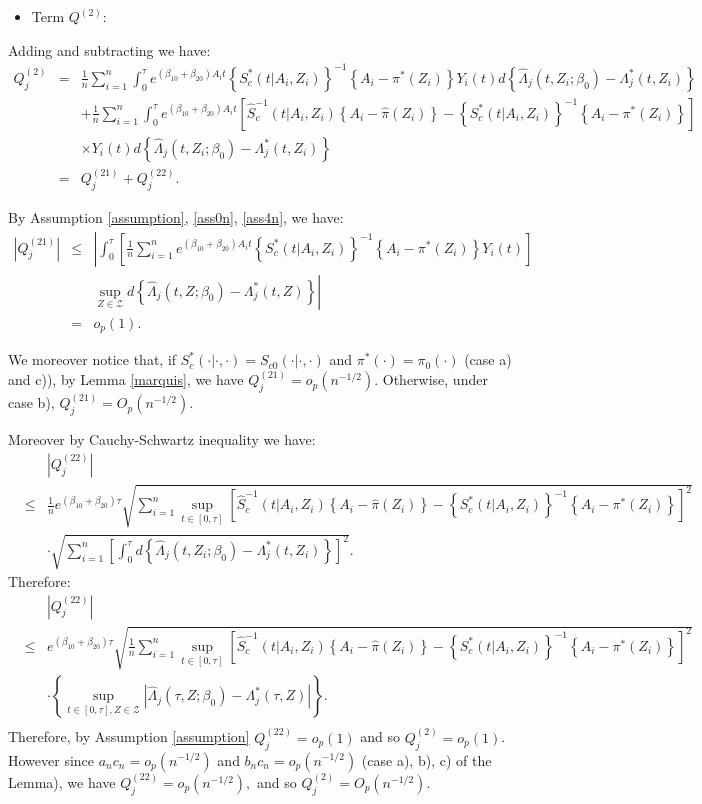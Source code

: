 \documentclass[11pt]{article}
\newcommand{\eqnn}{\begin{eqnarray*}}
\newcommand{\een}{\end{eqnarray*}}
\begin{document}
\begin{newproof7}
\begin{itemize}
\item{Term $Q^{(2)}$:}
\end{itemize}
Adding and subtracting we have:
\eqnn
Q^{(2)}_j&=&\frac{1}{n}\sum_{i=1}^n\int_0^\tau e^{ (\beta_{10}  + \beta_{20}) A_i t}\left\{S^{*}_c(t | A_i,Z_i)\right\}^{-1}\left\{A_i -\pi^{*}( Z_i)\right\}Y_i(t)d\left\{\hat \Lambda_{j}(t, Z_i ; \beta_0)-\Lambda^{*}_{j}(t, Z_i)\right\}\\
&&+\frac{1}{n}\sum_{i=1}^n\int_0^\tau e^{ (\beta_{10}  + \beta_{20}) A_i t}\left[\hat S^{-1}_c(t | A_i,Z_i)\left\{A_i -\hat \pi( Z_i)\right\}-\left\{S^{*}_c(t | A_i,Z_i)\right\}^{-1}\left\{A_i -\pi^{*}( Z_i)\right\}\right]\nonumber\\&&\times Y_i(t)d\left\{\hat \Lambda_{j}(t, Z_i ; \beta_0)-\Lambda^{*}_{j}(t, Z_i)\right\}\\
&=&Q^{(21)}_j+Q^{(22)}_j.
\een

By Assumption \ref{assumption}, \ref{ass0n}, \ref{ass4n}, we have:
\eqnn
\left|Q^{(21)}_j\right|&\leq&  \left|\int_0^\tau 
\left[ \frac{1}{n} \sum_{i=1}^ne^{(\beta_{10}+\beta_{20})A_it}\left\{S^{*}_c(t | A_i,Z_i)\right\}^{-1}\left\{A_i - \pi^{*}( Z_i)\right\}Y_i(t) \right]
\right.
\\
&&\left.\sup_{Z \in \mathcal{Z}}d\left\{\hat \Lambda_{j}(t,Z ; \beta_0)- \Lambda_j^{*}(t,Z)\right\}\right|
\\&=&o_p(1).\nonumber
\een

We moreover notice that, if $S^{*}_c(\cdot | \cdot, \cdot)=S_{c0}(\cdot | \cdot,\cdot)$ and $\pi^{*}(\cdot)=\pi_0(\cdot)$ (case a) and c)), by Lemma \ref{marquis}, we have $Q^{(21)}_j=o_p(n^{-1/2})$.
Otherwise, under case b), $Q^{(21)}_j=O_p(n^{-1/2})$.

Moreover by Cauchy-Schwartz inequality we have:
\eqnn
&&\left|Q^{(22)}_j\right|
\\&\leq&\frac{1}{n}e^{(\beta_{10}+\beta_{20})\tau}\sqrt{\sum_{i=1}^n\sup_{t \in [0,\tau]}\left[\hat S^{-1}_c(t | A_i,Z_i)\left\{A_i -\hat \pi( Z_i)\right\}- \left\{S^{*}_c(t | A_i,Z_i)\right\}^{-1}\left\{A_i - \pi^{*}( Z_i)\right\}\right]^2} \nonumber\\&&\cdot \sqrt{\sum_{i=1}^n\left[\int_0^\tau d\left\{\hat \Lambda_{j}(t,Z_i; \beta_0)-\Lambda^{*}_{j}(t,Z_i)\right\}\right]^2}.
\een
Therefore:
\eqnn
&&\left|Q^{(22)}_j\right|\\
&\leq&e^{(\beta_{10}+\beta_{20})\tau}\sqrt{\frac{1}{n}\sum_{i=1}^n\sup_{t \in [0,\tau]}\left[\hat S^{-1}_c(t | A_i,Z_i)\left\{A_i -\hat \pi( Z_i)\right\}- \left\{S^{*}_c(t | A_i,Z_i)\right\}^{-1}\left\{A_i - \pi^{*}( Z_i)\right\}\right]^2} \nonumber\\&&\cdot \left\{\sup_{t\in[0,\tau],Z\in\mathcal{Z}}\left|\hat \Lambda_j(\tau,Z; \beta_0)- \Lambda^{*}_j(\tau,Z)\right|\right\}\nonumber.\\
\een
Therefore, by Assumption \ref{assumption} $Q^{(22)}_j=o_p(1)$ and so $Q^{(2)}_j=o_p(1)$.  However since $a_nc_n=o_p(n^{-1/2})$ and $b_nc_n=o_p(n^{-1/2})$ (case a), b), c) of the Lemma), we have
$
Q^{(22)}_j=o_p(n^{-1/2}),
$
and so $Q^{(2)}_j=O_p(n^{-1/2})$.



\end{newproof7}
\end{document}
